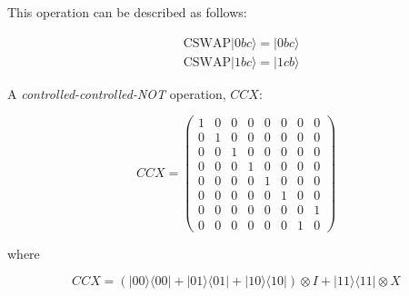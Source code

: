 \documentclass[svgnames]{article}     %
\begin{document}
This operation can be described as follows: 

\begin{align*}
  &\text{CSWAP} |0bc\rangle = |0bc\rangle \\
  &\text{CSWAP} |1bc\rangle = |1cb\rangle 
\end{align*}

A \textit{controlled-controlled-NOT} operation, $CCX$: 

\[
CCX = \begin{pmatrix}
  1 & 0 & 0 & 0 & 0 & 0 & 0 & 0 \\ 
  0 & 1 & 0 & 0 & 0 & 0 & 0 & 0 \\
  0 & 0 & 1 & 0 & 0 & 0 & 0 & 0 \\
  0 & 0 & 0 & 1 & 0 & 0 & 0 & 0 \\
  0 & 0 & 0 & 0 & 1 & 0 & 0 & 0 \\
  0 & 0 & 0 & 0 & 0 & 1 & 0 & 0 \\
  0 & 0 & 0 & 0 & 0 & 0 & 0 & 1 \\
  0 & 0 & 0 & 0 & 0 & 0 & 1 & 0 
\end{pmatrix} 
\] \vspace{5px}

where 

\[CCX = ( |00\rangle \langle 00 | + |01\rangle \langle 01 | + |10\rangle \langle 10 | ) \otimes I + |11\rangle \langle 11 | \otimes X\]
\end{document}

